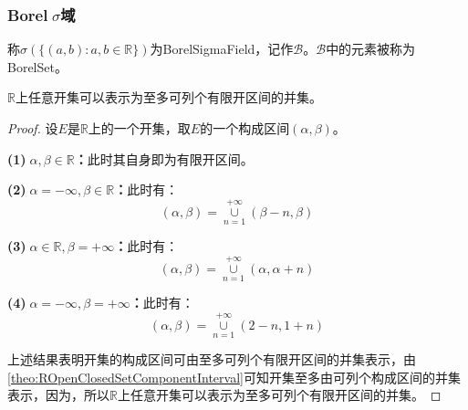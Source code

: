 \subsubsection{Borel$\;\sigma$域}
\begin{definition}
	称$\sigma(\{(a,b):a,b\in\mathbb{R}\})$为\gls{BorelSigmaField}，记作$\mathcal{B}$。$\mathcal{B}$中的元素被称为\gls{BorelSet}。
\end{definition}
\begin{lemma}\label{lem:OpenSet=CountableFiniteOpenSetUnion}
	$\mathbb{R}$上任意开集可以表示为至多可列个有限开区间的并集。
\end{lemma}
\begin{proof}
	设$E$是$\mathbb{R}$上的一个开集，取$E$的一个构成区间$(\alpha,\beta)$。\par
	\textbf{(1)$\;\alpha,\beta\in\mathbb{R}$：}此时其自身即为有限开区间。\par
	\textbf{(2)$\;\alpha=-\infty,\beta\in\mathbb{R}$：}此时有：
	\begin{equation*}
		(\alpha,\beta)=\underset{n=1}{\overset{+\infty}{\cup}}(\beta-n,\beta)
	\end{equation*}\par
	\textbf{(3)$\;\alpha\in\mathbb{R},\beta=+\infty$：}此时有：
	\begin{equation*}
		(\alpha,\beta)=\underset{n=1}{\overset{+\infty}{\cup}}(\alpha,\alpha+n)
	\end{equation*}\par
	\textbf{(4)$\;\alpha=-\infty,\beta=+\infty$：}此时有：
	\begin{equation*}
		(\alpha,\beta)=\underset{n=1}{\overset{+\infty}{\cup}}(2-n,1+n)
	\end{equation*}\par
	上述结果表明开集的构成区间可由至多可列个有限开区间的并集表示，由\cref{theo:ROpenClosedSetComponentInterval}可知开集至多由可列个构成区间的并集表示，因为，所以$\mathbb{R}$上任意开集可以表示为至多可列个有限开区间的并集。
\end{proof}
